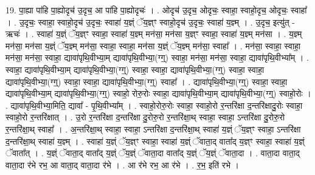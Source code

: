 \documentclass[17pt]{extarticle}
\begin{document}
19. पा॒ह्या पा॑हि पा॒ह्योदृच॑ उ॒दृच॒ आ पा॑हि पा॒ह्योदृचः॑ । . ओदृच॑ उ॒दृच॒ ओदृचः॒ स्वाहा॒ स्वाहो॒दृच॒ ओदृचः॒ स्वाहा᳚ । . उ॒दृचः॒ स्वाहा॒ स्वाहो॒दृच॑ उ॒दृचः॒ स्वाहा॑ य॒ज्ञ्ं ॅय॒ज्ञ्ꣳ स्वाहो॒दृच॑ उ॒दृचः॒ स्वाहा॑ य॒ज्ञ्म् । . उ॒दृच॒ इत्यु॑त् - ऋचः॑ । . स्वाहा॑ य॒ज्ञ्ं ॅय॒ज्ञ्ꣳ स्वाहा॒ स्वाहा॑ य॒ज्ञ्म् मन॑सा॒ मन॑सा य॒ज्ञ्ꣳ स्वाहा॒ स्वाहा॑ य॒ज्ञ्म् मन॑सा । . य॒ज्ञ्म् मन॑सा॒ मन॑सा य॒ज्ञ्ं ॅय॒ज्ञ्म् मन॑सा॒ स्वाहा॒ स्वाहा॒ मन॑सा य॒ज्ञ्ं ॅय॒ज्ञ्म् मन॑सा॒ स्वाहा᳚ । . मन॑सा॒ स्वाहा॒ स्वाहा॒ मन॑सा॒ मन॑सा॒ स्वाहा॒ द्यावा॑पृथि॒वीभ्या॒म् द्यावा॑पृथि॒वीभ्या॒(ग्ग्॒) स्वाहा॒ मन॑सा॒ मन॑सा॒ स्वाहा॒ द्यावा॑पृथि॒वीभ्या᳚म् । . स्वाहा॒ द्यावा॑पृथि॒वीभ्या॒म् द्यावा॑पृथि॒वीभ्या॒(ग्ग्॒) स्वाहा॒ स्वाहा॒ द्यावा॑पृथि॒वीभ्या॒(ग्ग्॒) स्वाहा॒ स्वाहा॒ द्यावा॑पृथि॒वीभ्या॒(ग्ग्॒) स्वाहा॒ स्वाहा॒ द्यावा॑पृथि॒वीभ्या॒(ग्ग्॒) स्वाहा᳚ । . द्यावा॑पृथि॒वीभ्या॒(ग्ग्॒) स्वाहा॒ स्वाहा॒ द्यावा॑पृथि॒वीभ्या॒म् द्यावा॑पृथि॒वीभ्या॒(ग्ग्॒) स्वाहो॒ रोरु॒रोः स्वाहा॒ द्यावा॑पृथि॒वीभ्या॒म् द्यावा॑पृथि॒वीभ्या॒(ग्ग्॒) स्वाहो॒रोः । . द्यावा॑पृथि॒वीभ्या॒मिति॒ द्यावा᳚ - पृ॒थि॒वीभ्या᳚म् । . स्वाहो॒रोरु॒रोः स्वाहा॒ स्वाहो॒रो र॒न्तरि॑क्षा द॒न्तरि॑क्षादु॒रोः स्वाहा॒ स्वाहो॒रो र॒न्तरि॑क्षात् । . उ॒रो र॒न्तरि॑क्षा द॒न्तरि॑क्षा दु॒रोरु॒रो र॒न्तरि॑क्षा॒थ् स्वाहा॒ स्वाहा॒ ऽन्तरि॑क्षा दु॒रोरु॒रो र॒न्तरि॑क्षा॒थ् स्वाहा᳚ । . अ॒न्तरि॑क्षा॒थ् स्वाहा॒ स्वाहा॒ ऽन्तरि॑क्षा द॒न्तरि॑क्षा॒थ् स्वाहा॑ य॒ज्ञ्ं ॅय॒ज्ञ्ꣳ स्वाहा॒ ऽन्तरि॑क्षा द॒न्तरि॑क्षा॒थ् स्वाहा॑ य॒ज्ञ्म् । . स्वाहा॑ य॒ज्ञ्ं ॅय॒ज्ञ्ꣳ स्वाहा॒ स्वाहा॑ य॒ज्ञ्ं ॅवाता॒द् वाता᳚द् य॒ज्ञ्ꣳ स्वाहा॒ स्वाहा॑ य॒ज्ञ्ं ॅवाता᳚त् । . य॒ज्ञ्ं ॅवाता॒द् वाता᳚द् य॒ज्ञ्ं ॅय॒ज्ञ्ं ॅवाता॒दा वाता᳚द् य॒ज्ञ्ं ॅय॒ज्ञ्ं ॅवाता॒दा । . वाता॒दा वाता॒द् वाता॒दा र॑भे रभ॒ आ वाता॒द् वाता॒दा र॑भे । . आ र॑भे रभ॒ आ र॑भे । . र॒भ॒ इति॑ रभे । \newline
\pagebreak
{}
\end{document}
